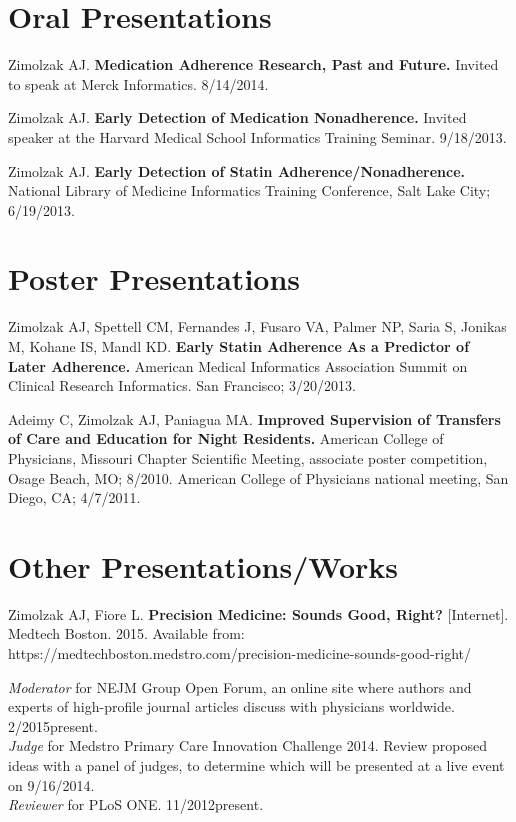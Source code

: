 \documentclass[12pt]{article}
\begin{document}
\section*{Oral Presentations} %

Zimolzak AJ. \textbf{Medication Adherence Research, Past and Future.}
Invited to speak at Merck Informatics. 8/14/2014.

Zimolzak AJ. \textbf{Early Detection of Medication Nonadherence.}
Invited speaker at the Harvard Medical School Informatics Training
Seminar. 9/18/2013.

Zimolzak AJ. \textbf{Early Detection of Statin
  Adherence/Nonadherence.} National Library of Medicine Informatics
Training Conference, Salt Lake City; 6/19/2013.

\section*{Poster Presentations}

Zimolzak AJ, Spettell CM, Fernandes J, Fusaro VA, Palmer NP, Saria S,
Jonikas M, Kohane IS, Mandl KD. \textbf{Early Statin
  Adherence As a Predictor of Later Adherence.} American Medical
Informatics Association Summit on Clinical Research Informatics. San
Francisco; 3/20/2013.

Adeimy C, Zimolzak AJ, Paniagua MA. \textbf{Improved Supervision of
  Transfers of Care and Education for Night Residents.} American
College of Physicians, Missouri Chapter Scientific Meeting, associate
poster competition, Osage Beach, MO; 8/2010. American College of
Physicians national meeting, San Diego, CA; 4/7/2011.

\section*{Other Presentations/Works}

Zimolzak AJ, Fiore L. \textbf{Precision Medicine: Sounds Good, Right?}
[Internet]. Medtech Boston. 2015. Available from:
https://medtechboston.medstro.com/precision-medicine-sounds-good-right/

\emph{Moderator} for NEJM Group Open Forum, an online site where
authors and experts of high-profile journal articles discuss with
physicians worldwide. 2/2015\ndash{}present.\\
\emph{Judge} for Medstro Primary Care Innovation Challenge 2014.
Review proposed ideas with a panel of judges, to determine which will
be presented at a live event on 9/16/2014.\\
\emph{Reviewer} for PLoS ONE. 11/2012\ndash{}present.
\end{document}
